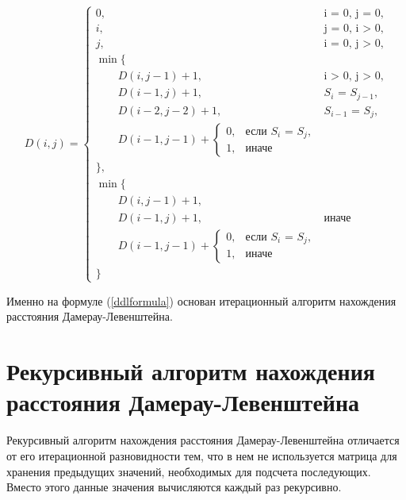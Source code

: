 \documentclass[12pt]{report}
\begin{document}
	\begin{equation}
	\label{ddlformula}
	D(i, j) = \begin{cases}
		
		0, &\text{i = 0, j = 0,}\\
		i, &\text{j = 0, i > 0,}\\
		j, &\text{i = 0, j > 0,}\\
		
		\min \lbrace \\
		\qquad D(i, j-1) + 1,&\text{i > 0, j > 0,}\\
		\qquad D(i-1, j) + 1,&\text{$S_{i}$ = $S_{j-1}$,}\\
		\qquad D(i-2, j-2) + 1,&\text{$S_{i-1}$ = $S_{j}$,}\\
		\qquad D(i-1, j-1) + \begin{cases}
                        		0, &\text{если $S_{i}$ = $S_{j}$,}\\
                        		1, &\text{иначе}
                        	\end{cases}\\
		\rbrace,\\
		
		\min \lbrace \\
		\qquad D(i, j-1) + 1,\\
		\qquad D(i-1, j) + 1,&\text{иначе}\\
		\qquad D(i-1, j-1) + \begin{cases}
                        		0, &\text{если $S_{i}$ = $S_{j}$,}\\
                        		1, &\text{иначе}
                        	\end{cases}\\
		\rbrace
	\end{cases}
	\end{equation}
	
	Именно на формуле (\ref{ddlformula}) основан итерационный алгоритм нахождения расстояния Дамерау-Левенштейна.
	
	\section{Рекурсивный алгоритм нахождения расстояния Дамерау-Левенштейна}
	
	Рекурсивный алгоритм нахождения расстояния Дамерау-Левенштейна отличается от его итерационной разновидности тем, что в нем не используется матрица для хранения предыдущих значений, необходимых для подсчета последующих. Вместо этого данные значения вычисляются каждый раз рекурсивно. 
	
\end{document}
